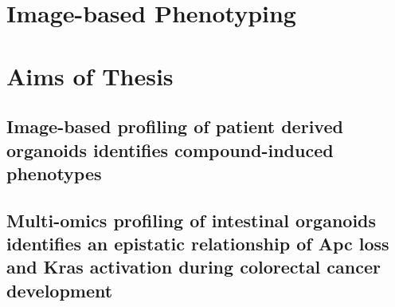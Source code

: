 \begin{flushleft}
\section{Image-based Phenotyping}
\section{Aims of Thesis}
\subsection{Image-based profiling of patient derived organoids identifies compound-induced phenotypes}
\subsection{Multi-omics profiling of intestinal organoids identifies an epistatic relationship of Apc loss and Kras activation during colorectal cancer development}
\end{flushleft}
